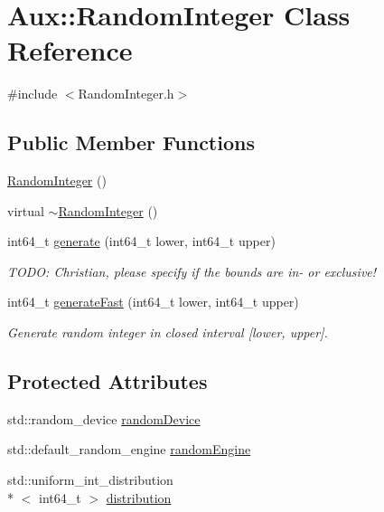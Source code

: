 \hypertarget{class_aux_1_1_random_integer}{\section{Aux\-:\-:Random\-Integer Class Reference}
\label{class_aux_1_1_random_integer}
}


{\ttfamily \#include $<$Random\-Integer.\-h$>$}

\subsection*{Public Member Functions}
\begin{DoxyCompactItemize}
\item 
\hyperlink{class_aux_1_1_random_integer_a7c8907db6dc8cdd77822c6d015b05c34}{Random\-Integer} ()
\item 
virtual \hyperlink{class_aux_1_1_random_integer_a7806fd3b03deb0704be523a37677d6dd}{$\sim$\-Random\-Integer} ()
\item 
int64\-\_\-t \hyperlink{class_aux_1_1_random_integer_ae9b3f587dea87fedd80bafa63f0088ff}{generate} (int64\-\_\-t lower, int64\-\_\-t upper)
\begin{DoxyCompactList}\small\item\em T\-O\-D\-O\-: Christian, please specify if the bounds are in-\/ or exclusive! \end{DoxyCompactList}\item 
int64\-\_\-t \hyperlink{class_aux_1_1_random_integer_a0d59c349439038feb44022e3374cc452}{generate\-Fast} (int64\-\_\-t lower, int64\-\_\-t upper)
\begin{DoxyCompactList}\small\item\em Generate random integer in closed interval \mbox{[}lower, upper\mbox{]}. \end{DoxyCompactList}\end{DoxyCompactItemize}
\subsection*{Protected Attributes}
\begin{DoxyCompactItemize}
\item 
std\-::random\-\_\-device \hyperlink{class_aux_1_1_random_integer_ad53ce69ad39005e2d155c3d7d3557873}{random\-Device}
\item 
std\-::default\-\_\-random\-\_\-engine \hyperlink{class_aux_1_1_random_integer_a5a4fca08fd29e0b6304d8294441c5711}{random\-Engine}
\item 
std\-::uniform\-\_\-int\-\_\-distribution\\*
$<$ int64\-\_\-t $>$ \hyperlink{class_aux_1_1_random_integer_a47ba003fbfaade85bb3072ff1063336e}{distribution}
\end{DoxyCompactItemize}


